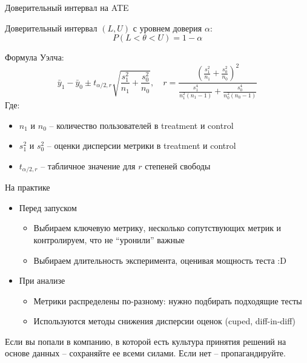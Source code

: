 \documentclass[11pt,aspectratio=169]{beamer}
\begin{document}
\begin{frame}{Доверительный интервал на ATE}

Доверительный интервал $(L, U)$ с уровнем доверия $\alpha$:
\[
P(L < \theta < U) = 1 - \alpha
\]

Формула Уэлча:
\[
\bar y_1 - \bar y_0 \pm t_{\alpha/2,r} \sqrt{\frac{s_1^2}{n_1} + \frac{s_0^2}{n_0}}, \quad
r = \frac{ \left( \frac{s_1^2}{n_1} + \frac{s_0^2}{n_0} \right)^2 }{ \frac{s_1^4}{n_1^2 (n_1 - 1)} + \frac{s_0^4}{n_0^2 (n_0 - 1)} }
\]
Где:
\begin{itemize}
\item $n_1$ и $n_0$ -- количество пользователей в treatment и control
\item $s_1^2$ и $s_0^2$ -- оценки дисперсии метрики в treatment и control
\item $t_{\alpha/2,r}$ -- табличное значение для $r$ степеней свободы
\end{itemize}

\end{frame}

\begin{frame}{На практике}

\begin{itemize}

\item Перед запуском
\begin{itemize}
\item Выбираем ключевую метрику, несколько сопутствующих метрик и контролируем, что не ``уронили'' важные
\item Выбираем длительность эксперимента, оценивая мощность теста :D
\end{itemize} 

\item При анализе
\begin{itemize}
\item Метрики распределены по-разному: нужно подбирать подходящие тесты
\item Используются методы снижения дисперсии оценок (cuped, diff-in-diff)
\end{itemize}

\end{itemize}

\vfill

\begin{tcolorbox}[colback=info!5,colframe=info!80]
Если вы попали в компанию, в которой есть культура принятия решений на основе данных -- сохраняйте ее всеми силами. Если нет -- пропагандируйте.
\end{tcolorbox}

\end{frame}
\end{document}
